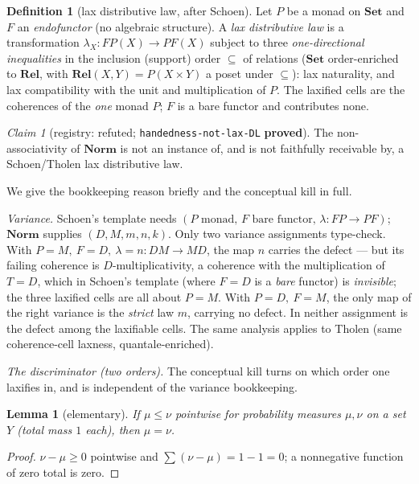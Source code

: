 \documentclass[11pt]{amsart}
\theoremstyle{plain}
\newtheorem{lemma}[theorem]{Lemma}
\theoremstyle{definition}
\newtheorem{definition}[theorem]{Definition}
\theoremstyle{remark}
\newtheorem{claim}[theorem]{Claim}
\newcommand{\Set}{\mathbf{Set}}
\newcommand{\Rel}{\mathbf{Rel}}
\newcommand{\Norm}{\mathbf{Norm}}
\begin{document}
\begin{definition}[lax distributive law, after Schoen]
\label{def:laxdl}
Let $P$ be a monad on $\Set$ and $F$ an \emph{endofunctor} (no algebraic structure). A \emph{lax
distributive law} is a transformation $\lambda_{X}\colon FP(X)\to PF(X)$ subject to three
\emph{one-directional inequalities} in the inclusion (support) order $\subseteq$ of relations
($\Set$ order-enriched to $\Rel$, with $\Rel(X,Y)=P(X\times Y)$ a poset under $\subseteq$): lax
naturality, and lax compatibility with the unit and multiplication of $P$. The laxified cells are the
coherences of the \emph{one} monad $P$; $F$ is a bare functor and contributes none.
\end{definition}

\begin{claim}[registry: refuted; \texttt{handedness-not-lax-DL} \textbf{proved}]
\label{clm:laxdl}
The non-associativity of $\Norm$ is not an instance of, and is not faithfully receivable by, a
Schoen/Tholen lax distributive law.
\end{claim}

We give the bookkeeping reason briefly and the conceptual kill in full.

\emph{Variance.} Schoen's template needs $(P\text{ monad},\,F\text{ bare functor},\,\lambda\colon
FP\to PF)$; $\Norm$ supplies $(D,M,m,n,k)$. Only two variance assignments type-check. With
$P=M,\ F=D,\ \lambda=n\colon DM\to MD$, the map $n$ carries the defect --- but its failing coherence
is $D$-multiplicativity, a coherence with the multiplication of $T=D$, which in Schoen's template
(where $F=D$ is a \emph{bare} functor) is \emph{invisible}; the three laxified cells are all about
$P=M$. With $P=D,\ F=M$, the only map of the right variance is the \emph{strict} law $m$, carrying no
defect. In neither assignment is the defect among the laxifiable cells. The same analysis applies to
Tholen (same coherence-cell laxness, quantale-enriched).

\emph{The discriminator (two orders).} The conceptual kill turns on which order one laxifies in, and
is independent of the variance bookkeeping.

\begin{lemma}[elementary]
\label{lem:incomparable}
If $\mu\le\nu$ pointwise for probability measures $\mu,\nu$ on a set $Y$ (total mass $1$ each), then
$\mu=\nu$.
\end{lemma}
\begin{proof}
$\nu-\mu\ge 0$ pointwise and $\sum(\nu-\mu)=1-1=0$; a nonnegative function of zero total is zero.
\end{proof}
\end{document}
